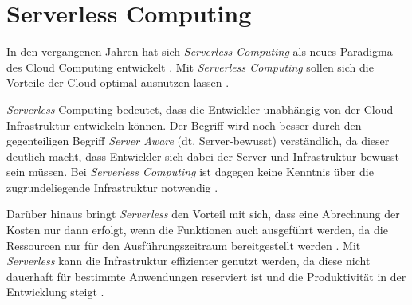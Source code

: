 \section{Serverless Computing} %
\label{sec:serverless-serveraware}





In den vergangenen Jahren hat sich \textit{Serverless Computing} als neues Paradigma des Cloud Computing entwickelt \cite[Vgl.][S. 44]{Castro2019}\cite[Vgl.][S. 64]{Anel2020}. Mit \textit{Serverless Computing} sollen sich die Vorteile der Cloud optimal ausnutzen lassen \cite[Vgl.][S. 6]{Eivy2017}\cite[Vgl.][S. 8]{Jonas2019}.

\textit{Serverless} Computing bedeutet, dass die Entwickler unabhängig von der Cloud-Infrastruktur entwickeln können. Der Begriff wird noch besser durch den gegenteiligen Begriff \textit{Server Aware} (dt. Server-bewusst) verständlich, da dieser deutlich macht, dass Entwickler sich dabei der Server und Infrastruktur bewusst sein müssen. Bei \textit{Serverless Computing} ist dagegen keine Kenntnis über die zugrundeliegende Infrastruktur notwendig \cite[Vgl.][S. 5]{Jonas2019}\cite[Vgl.][S. 1]{Hellerstein2018}\cite[Vgl.][S. 46]{Castro2019}\cite[Vgl.][S. 64]{Anel2020}.

Darüber hinaus bringt \textit{Serverless} den Vorteil mit sich, dass eine Abrechnung der Kosten nur dann erfolgt, wenn die Funktionen auch ausgeführt werden, da die Ressourcen nur für den Ausführungszeitraum bereitgestellt werden \cite[Vgl.][S. 46]{Castro2019}. Mit \textit{Serverless} kann die Infrastruktur effizienter genutzt werden, da diese nicht dauerhaft für bestimmte Anwendungen reserviert ist und die Produktivität in der Entwicklung steigt \cite[Vgl.][S. 9]{Jonas2019}.
\pagebreak